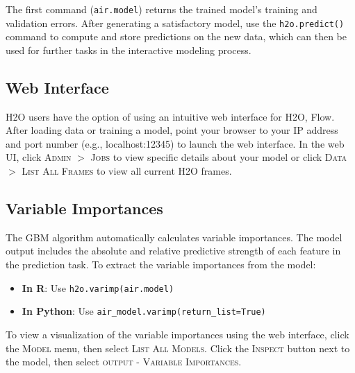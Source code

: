 \begin{minipage}{\textwidth}
\waterExampleInPython

\end{minipage}

The first command ({\texttt{air.model}}) returns the trained model's training and validation errors.
After generating a satisfactory model, use the \texttt{h2o.predict()} command to compute and store predictions on the
new data, which can then be used for further tasks in the interactive modeling process.

\begin{minipage}{\textwidth}
\waterExampleInR

\end{minipage}

\begin{minipage}{\textwidth}
\waterExampleInPython

\end{minipage}

\subsection{Web Interface}

H2O users have the option of using an intuitive web interface for H2O, Flow. After loading data or training a model, point your browser to your IP address and port number (e.g., localhost:12345) to launch the web interface. In the web UI, click \textsc{Admin} $>$ \textsc{Jobs} to view specific details about your model or click \textsc{Data} $>$ \textsc{List All Frames} to view all current H2O frames.

\subsection{Variable Importances}

The GBM algorithm automatically calculates variable importances. The model output includes the absolute and relative predictive strength of each feature in the prediction task. To extract the variable importances from the model:
\begin{itemize}
\item \textbf{In R}: Use \texttt{h2o.varimp(air.model)} 
\item \textbf{In Python}: Use \texttt{air\_model.varimp(return\_list=True)}
\end{itemize}

To view a visualization of the variable importances using the web interface, click the \textsc{Model} menu, then select \textsc{List All Models}. Click the \textsc{Inspect} button next to the model, then select \textsc{output - Variable Importances}. 

